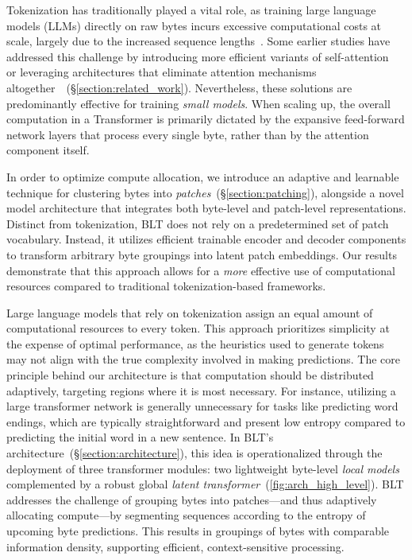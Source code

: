 Tokenization has traditionally played a vital role, as training large language models (LLMs) directly on raw bytes incurs excessive computational costs at scale, largely due to the increased sequence lengths~\citep{xue2022byt5}. Some earlier studies have addressed this challenge by introducing more efficient variants of self-attention~\citep{el2020characterbert, clark2022canine} or leveraging architectures that eliminate attention mechanisms altogether~\citep{wang2024mambabyte}~(\S\ref{section:related_work}). Nevertheless, these solutions are predominantly effective for training \textit{small models}. When scaling up, the overall computation in a Transformer is primarily dictated by the expansive feed-forward network layers that process every single byte, rather than by the attention component itself.

In order to optimize compute allocation, we introduce an adaptive and learnable technique for clustering bytes into \textit{patches}~(\S\ref{section:patching}), alongside a novel model architecture that integrates both byte-level and patch-level representations. Distinct from tokenization, {\textsc BLT} does not rely on a predetermined set of patch vocabulary. Instead, it utilizes efficient trainable encoder and decoder components to transform arbitrary byte groupings into latent patch embeddings. Our results demonstrate that this approach allows for a \textit{more} effective use of computational resources compared to traditional tokenization-based frameworks.

Large language models that rely on tokenization assign an equal amount of computational resources to every token. This approach prioritizes simplicity at the expense of optimal performance, as the heuristics used to generate tokens may not align with the true complexity involved in making predictions. The core principle behind our architecture is that computation should be distributed adaptively, targeting regions where it is most necessary. For instance, utilizing a large transformer network is generally unnecessary for tasks like predicting word endings, which are typically straightforward and present low entropy compared to predicting the initial word in a new sentence. In {\textsc BLT}'s architecture~(\S\ref{section:architecture}), this idea is operationalized through the deployment of three transformer modules: two lightweight byte-level \textit{local models} complemented by a robust global \textit{latent transformer}~(\autoref{fig:arch_high_level}).
{\textsc BLT} addresses the challenge of grouping bytes into patches—and thus adaptively allocating compute—by segmenting sequences according to the entropy of upcoming byte predictions. This results in groupings of bytes with comparable information density, supporting efficient, context-sensitive processing.

